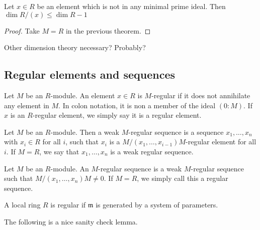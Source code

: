 \begin{corollary}
  \label{cor:quotient_non_minimal_sub_dim_1}
  Let $x \in R$ be an element which is not in any 
  minimal prime ideal.
  Then $\dim R / (x) \leq \dim R - 1$
\end{corollary}

\begin{proof}

  Take $M = R$ in the previous theorem.
\end{proof}


Other dimension theory necessary? Probably?

\subsection{Regular elements and sequences}

\begin{definition}
  \label{def:reg_elt}
  Let $M$ be an $R$-module.
  An element $x \in R$ is $M$-regular if it does 
  not annihilate any element in $M$.
  In colon notation, it is non a member of the ideal
  $( 0 : M )$.
  If $x$ is an $R$-regular element, we simply say it is 
  a regular element.
\end{definition}

\begin{definition}
  \label{def:weak_reg_seq}
  Let $M$ be an $R$-module.
  Then a weak $M$-regular sequence
  is a sequence $x_1, \ldots, x_n$ 
  with $x_i \in R$ for all $i$,
  such that 
  $x_i$ is a
  $M / (x_1, \ldots, x_{i-1}) M$-regular
  element for all $i$.
  If $M = R$, we say that $x_1, \ldots, x_n$
  is a weak regular sequence. 
\end{definition}

\begin{definition}
  \label{def:reg_seq}
  Let $M$ be an $R$-module.
  An $M$-regular sequence is a weak $M$-regular sequence
  such that $M / (x_1, \ldots, x_n) M \neq 0$.
  If $M = R$, we simply call this a regular sequence.
\end{definition}


\begin{definition}
  \label{def:reg_loc}
  A local ring $R$ is regular if 
  $\mathfrak{m}$ is generated by a system of parameters.
\end{definition}

The following is a nice sanity check lemma.

